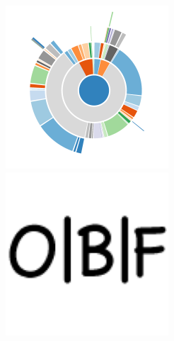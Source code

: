 \documentclass[trans]{beamer}
\begin{document}
{\begin{minipage}{1\textwidth}
\begin{columns}
  \includegraphics[width=0.5\textwidth]{figures/quantifiedcode-logo.png}\\
  \includegraphics[width=0.5\textwidth]{figures/obf-logo.png}\\
  \end{columns}
  \end{minipage}
}
\end{document}
